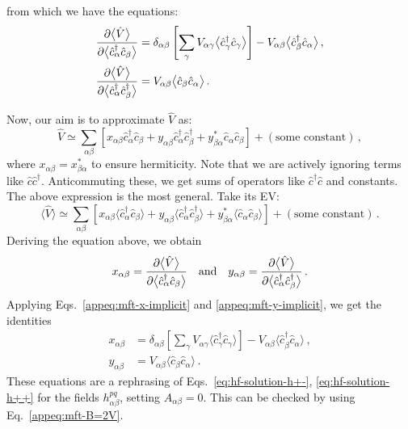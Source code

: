 from which we have the equations:
\begin{align}
	\pdv{\big\langle \hat V \big\rangle}{\big\langle \hat c_\alpha^\dagger \hat c_\beta \big\rangle} &= \delta_{\alpha\beta} \left[
	\sum_\gamma V_{\alpha\gamma} \big\langle \hat c_\gamma^\dagger \hat c_\gamma \big\rangle
	\right] - V_{\alpha\beta} \big\langle \hat c_\beta^\dagger \hat c_\alpha \big\rangle \, , \label{appeq:mft-x-implicit}
	\\
	\pdv{\big\langle \hat V \big\rangle}{\big\langle \hat c_\alpha^\dagger \hat c_\beta^\dagger \big\rangle} &= V_{\alpha\beta} \big\langle \hat c_\beta \hat c_\alpha \big\rangle \, . \label{appeq:mft-y-implicit}
\end{align}

Now, our aim is to approximate $\hat V$ as:
\begin{equation}\label{appeq:mft-V-implicit}
	\hat V \simeq \sum_{\alpha\beta} \left[
	x_{\alpha\beta} \hat c_\alpha^\dagger \hat c_\beta + y_{\alpha\beta} \hat c_\alpha^\dagger \hat c_\beta^\dagger + y_{\beta\alpha}^* \hat c_\alpha \hat c_\beta
	\right] + (\text{some constant}) \, ,
\end{equation}
where $x_{\alpha\beta} = x_{\beta\alpha}^*$ to ensure hermiticity. Note that we are actively ignoring terms like $\hat c \hat c^\dagger$. Anticommuting these, we get sums of operators like $\hat c^\dagger \hat c$ and constants. The above expression is the most general. Take its EV:
\[
\big\langle \hat V \big\rangle \simeq \sum_{\alpha\beta} \left[
x_{\alpha\beta} \big\langle \hat c_\alpha^\dagger \hat c_\beta \big\rangle + y_{\alpha\beta} \big\langle \hat c_\alpha^\dagger \hat c_\beta^\dagger \big\rangle + y_{\beta\alpha}^* \big\langle \hat c_\alpha \hat c_\beta \big\rangle
\right] + (\text{some constant}) \, .
\]
Deriving the equation above, we obtain
\[
x_{\alpha\beta} = \pdv{\big\langle \hat V \big\rangle}{\big\langle \hat c_\alpha^\dagger \hat c_\beta \big\rangle}
\qq{and}
y_{\alpha\beta} = \pdv{\big\langle \hat V \big\rangle}{\big\langle \hat c_\alpha^\dagger \hat c_\beta^\dagger \big\rangle} \, .
\]
Applying Eqs.~\eqref{appeq:mft-x-implicit} and \eqref{appeq:mft-y-implicit}, we get the identities
\begin{align}
	x_{\alpha\beta} &= \delta_{\alpha\beta} \left[
	\sum_\gamma V_{\alpha\gamma} \big\langle \hat c_\gamma^\dagger \hat c_\gamma \big\rangle
	\right] - V_{\alpha\beta} \big\langle \hat c_\beta^\dagger \hat c_\alpha \big\rangle \, , \label{appeq:mft-x-explicit}
	\\
	y_{\alpha\beta} &= V_{\alpha\beta} \big\langle \hat c_\beta \hat c_\alpha \big\rangle \, . \label{appeq:mft-y-explicit}
\end{align}
These equations are a rephrasing of Eqs.~\eqref{eq:hf-solution-h+-}, \eqref{eq:hf-solution-h++} for the fields $h_{\alpha\beta}^{pq}$, setting $A_{\alpha\beta}=0$. This can be checked by using Eq.~\eqref{appeq:mft-B=2V}.

